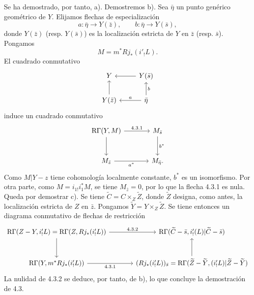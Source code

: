 Se ha demostrado, por tanto, a). Demostremos b). Sea $\bar\eta$ un punto genérico geométrico de $Y$. Elijamos flechas de especialización
\[
a:\bar\eta\to Y(\bar z),\qquad b:\bar\eta\to Y(\bar s),
\]
donde $Y(\bar z)$ (resp. $Y(\bar s)$) es la localización estricta de $Y$ en $\bar z$ (resp. $\bar s$). Pongamos
\[
M=m^*Rj_*(i'_!L).
\]
El cuadrado conmutativo
\[
\begin{tikzcd}
Y & Y(\bar s)\arrow[l]\\
Y(\bar z)\arrow[u] & \bar\eta \arrow[l,"a"']\arrow[u,"b"']
\end{tikzcd}
\]
induce un cuadrado conmutativo
\[
\begin{tikzcd}[column sep=large,row sep=large]
\mathrm R\Gamma(Y,M) \arrow[r,"4.3.1"] \arrow[d] & M_{\bar s} \arrow[d,"b^*"]\\
M_{\bar z} \arrow[r,"a^*"'] & M_{\bar\eta}.
\end{tikzcd}
\]
Como $M|Y-z$ tiene cohomología localmente constante, $b^*$ es un isomorfismo. Por otra parte, como $M=i_{1!}i_1^*M$, se tiene $M_{\bar z}=0$, por lo que la flecha 4.3.1 es nula. Queda por demostrar c). Se tiene $\widetilde C=C\times_Z\widetilde Z$, donde $\widetilde Z$ designa, como antes, la localización estricta de $Z$ en $\bar z$. Pongamos $\widetilde Y=Y\times_Z\widetilde Z$. Se tiene entonces un diagrama conmutativo de flechas de restricción
\[
\begin{tikzcd}[column sep=large,row sep=large]
\mathrm R\Gamma(Z-Y,i'_!L)=\mathrm R\Gamma(Z,Rj_*(i'_!L))
 \arrow[r,"4.3.2"] \arrow[d]
&
\mathrm R\Gamma(\widetilde C-\bar s,i'_!(L)|\widetilde C-\bar s)\\
\mathrm R\Gamma(Y,m^*Rj_*(i'_!L)) \arrow[r,"4.3.1"']
&
(Rj_*(i'_!L))_{\bar s}
  =\mathrm R\Gamma(\widetilde Z-\widetilde Y,(i'_!L)|\widetilde Z-\widetilde Y) \arrow[u]
\end{tikzcd}
\]
La nulidad de 4.3.2 se deduce, por tanto, de b), lo que concluye la demostración de 4.3.
